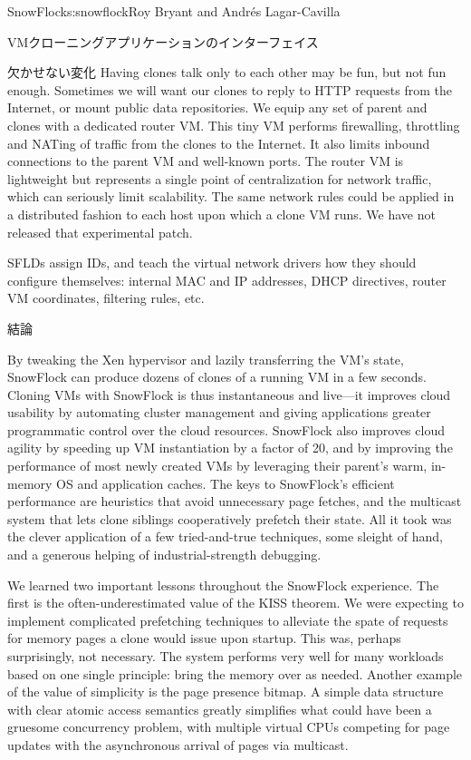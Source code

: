 \begin{aosachapter}{SnowFlock}{s:snowflock}{Roy Bryant and Andr\'e{s} Lagar-Cavilla}
\begin{aosasect1}{VMクローニングアプリケーションのインターフェイス}
\begin{aosasect2}{欠かせない変化}
Having clones talk only to each other may be fun, but not fun enough.
Sometimes we will want our clones to reply to HTTP requests from the
Internet, or mount public data repositories. We equip any set of
parent and clones with a dedicated router VM\@. This tiny VM performs
firewalling, throttling and NATing of traffic from the clones to the
Internet. It also limits inbound connections to the parent VM and
well-known ports.  The router VM is lightweight but represents a
single point of centralization for network traffic, which can
seriously limit scalability. The same network rules could be applied
in a distributed fashion to each host upon which a clone VM runs. We
have not released that experimental patch.

SFLDs assign IDs, and teach the virtual network drivers how they
should configure themselves: internal MAC and IP addresses, DHCP
directives, router VM coordinates, filtering rules, etc.

\end{aosasect2}

\end{aosasect1}

\begin{aosasect1}{結論}

By tweaking the Xen hypervisor and lazily transferring the VM's state,
SnowFlock can produce dozens of clones of a running VM in a few
seconds. Cloning VMs with SnowFlock is thus instantaneous and
live---it improves cloud usability by automating cluster management
and giving applications greater programmatic control over the cloud
resources. SnowFlock also improves cloud agility by speeding up VM
instantiation by a factor of 20, and by improving the performance of
most newly created VMs by leveraging their parent's warm, in-memory OS
and application caches. The keys to SnowFlock's efficient performance
are heuristics that avoid unnecessary page fetches, and the multicast
system that lets clone siblings cooperatively prefetch their
state. All it took was the clever application of a few tried-and-true
techniques, some sleight of hand, and a generous helping of
industrial-strength debugging.

We learned two important lessons throughout the SnowFlock experience.
The first is the often-underestimated value of the KISS theorem. We
were expecting to implement complicated prefetching techniques to
alleviate the spate of requests for memory pages a clone would issue
upon startup.  This was, perhaps surprisingly, not necessary. The
system performs very well for many workloads based on one single
principle: bring the memory over as needed.  Another example of the
value of simplicity is the page presence bitmap. A simple data
structure with clear atomic access semantics greatly simplifies what
could have been a gruesome concurrency problem, with multiple virtual
CPUs competing for page updates with the asynchronous arrival of pages
via multicast.


\end{aosasect1}
\end{aosachapter}
